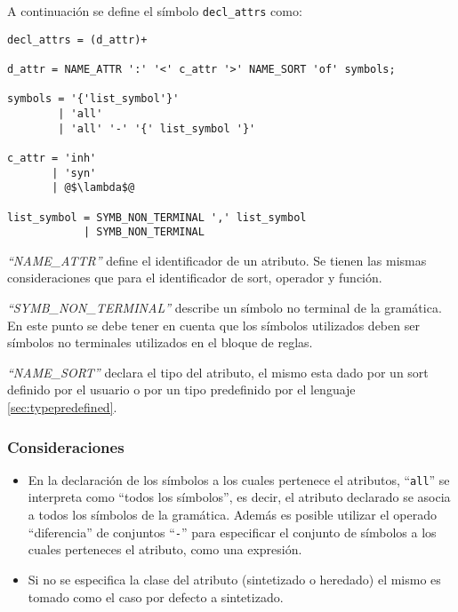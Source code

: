 A continuación se define el símbolo \texttt{decl\_attrs} como:

\begin{lstlisting}[escapeinside=@@, frame=shadowbox, rulesepcolor=\color{blue}, language=inform]
decl_attrs = (d_attr)+ 

d_attr = NAME_ATTR ':' '<' c_attr '>' NAME_SORT 'of' symbols;

symbols = '{'list_symbol'}' 
        | 'all'
        | 'all' '-' '{' list_symbol '}'

c_attr = 'inh'
       | 'syn'
       | @$\lambda$@

list_symbol = SYMB_NON_TERMINAL ',' list_symbol
            | SYMB_NON_TERMINAL 
\end{lstlisting}

\textit{``NAME\_ATTR''} define el identificador de un atributo. Se tienen las mismas consideraciones que para el identificador de sort, operador y función.

\textit{``SYMB\_NON\_TERMINAL''} describe un símbolo no terminal de la gramática. En este punto se debe tener en cuenta que los símbolos utilizados deben ser símbolos no terminales utilizados en el bloque de reglas.

\textit{``NAME\_SORT''} declara el tipo del atributo, el mismo esta dado por un sort definido por el usuario o por un tipo predefinido por el lenguaje \ref{sec:typepredefined}.

\subsubsection*{Consideraciones}

\begin{itemize}
\item En la declaración de los símbolos a los cuales pertenece el atributos, ``\texttt{all}'' se interpreta como ``todos los símbolos'', es decir, el atributo declarado se asocia a todos los símbolos de la gramática. Además es posible utilizar el operado ``diferencia'' de conjuntos ``\texttt{-}'' para especificar el conjunto de símbolos a los cuales perteneces el atributo, como una expresión.

\item Si no se especifica la clase del atributo (sintetizado o heredado) el mismo es tomado como el caso por defecto a sintetizado.
\end{itemize}


